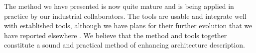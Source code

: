 \documentclass[a4paper,twoside]{article}
\begin{document}
The method we have presented is now quite mature and is being applied in practice by our industrial collaborators. The tools are usable and integrate well with established tools, although we have plans for their further evolution that we have reported elsewhere \cite{Henderson4}. We believe that the method and tools together constitute a sound and practical method of enhancing architecture description.





\renewcommand{\baselinestretch}{0.98}

{\small
}
\renewcommand{\baselinestretch}{1}
\end{document}
